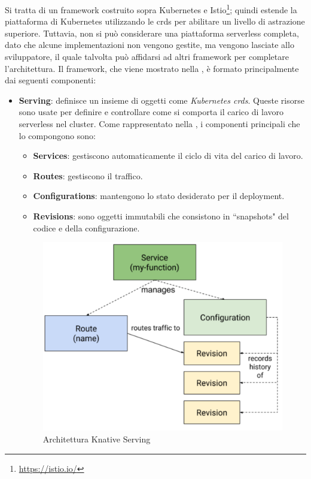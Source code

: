 \documentclass[12pt,a4paper,openany,twoside]{book}
\begin{document}
Si tratta di un framework costruito sopra Kubernetes e Istio\footnote{\url{https://istio.io/}}; quindi estende la piattaforma di Kubernetes utilizzando le \acp{crd} per abilitare un livello di astrazione superiore. Tuttavia, non si può considerare una piattaforma serverless completa, dato che alcune implementazioni non vengono gestite, ma vengono lasciate allo sviluppatore, il quale talvolta può affidarsi ad altri framework per completare l'architettura.
Il framework, che viene mostrato nella , è formato principalmente dai seguenti componenti:
\begin{itemize}
    \item \textbf{Serving}: definisce un insieme di oggetti come \textit{Kubernetes \acp{crd}}. Queste risorse sono usate per definire e controllare come si comporta il carico di lavoro serverless nel cluster. Come rappresentato nella , i componenti principali che lo compongono sono:
        \begin{itemize}
            \item \textbf{Services}: gestiscono automaticamente il ciclo di vita del carico di lavoro.
            
            \item \textbf{Routes}: gestiscono il traffico.
            
            \item \textbf{Configurations}: mantengono lo stato desiderato per il deployment.
            
            \item \textbf{Revisions}: sono oggetti immutabili che consistono in ``snapshots" del codice e della configurazione.
        \end{itemize}
        
    \begin{figure}[ht]
        \centering
        \includegraphics[width=0.9\linewidth]{figures/knative_serving.pdf}
        \caption{Architettura Knative Serving}
        \label{fig:architettura-knative-serving}
    \end{figure}
    

\end{itemize}
\end{document}
